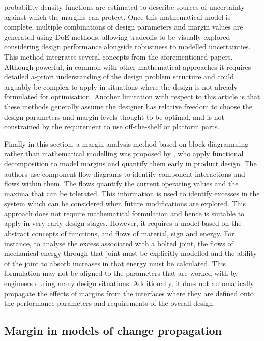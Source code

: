 probability density functions are estimated to describe sources of uncertainty against which the margins can protect. Once this mathematical model is complete, multiple combinations of design parameters and margin values are generated using DoE methods, allowing tradeoffs to be visually explored considering design performance alongside robustness to modelled uncertainties. This method integrates several concepts from the aforementioned papers. Although powerful, in common with other mathematical approaches it requires detailed a-priori understanding of the design problem structure and could arguably be complex to apply in situations where the design is not already formulated for optimisation. Another limitation with respect to this article is that these methods generally assume the designer has relative freedom to choose the design parameters and margin levels thought to be optimal, and is not constrained by the requirement to use off-the-shelf or platform parts.
 
Finally in this section, a margin analysis method based on block diagramming rather than mathematical modelling was proposed by \cite{Cansler2016}, who apply functional decomposition to model margins and quantify them early in product design. The authors use component-flow diagrams to identify component interactions and flows within them. The flows quantify the current operating values and the maxima that can be tolerated. This information is used to identify excesses in the system which can be considered when future modifications are explored. This approach does not require mathematical formulation and hence is suitable to apply in very early design stages. However, it requires a model based on the abstract concepts of functions, and flows of material, sign and energy. For instance, to analyse the excess associated with a bolted joint, the flows of mechanical energy through that joint must be explicitly modelled and the ability of the joint to absorb increases in that energy must be calculated. This formulation may not be aligned to the parameters that are worked with by engineers during many design situations. Additionally, it does not automatically propagate the effects of margins from the interfaces where they are defined onto the performance parameters and requirements of the overall design.

\subsection{Margin in models of change propagation}\label{changemodelsmargins}

